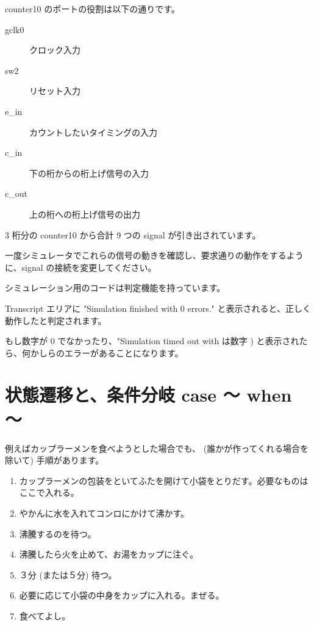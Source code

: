 \documentclass[letterpaper,10pt,dvipdfmx]{sphinxmanual}
\begin{document}
counter10 のポートの役割は以下の通りです。
\begin{description}
\item[{gclk0}] \leavevmode
クロック入力

\item[{sw2}] \leavevmode
リセット入力

\item[{e\_in}] \leavevmode
カウントしたいタイミングの入力

\item[{c\_in}] \leavevmode
下の桁からの桁上げ信号の入力

\item[{c\_out}] \leavevmode
上の桁への桁上げ信号の出力

\end{description}

3 桁分の counter10 から合計 9 つの signal が引き出されています。

一度シミュレータでこれらの信号の動きを確認し、要求通りの動作をするように、signal の接続を変更してください。

シミュレーション用のコードは判定機能を持っています。

Transcript エリアに "Simulation finished with 0 errors." と表示されると、正しく動作したと判定されます。

もし数字が 0 でなかったり、"Simulation timed out with  は数字 ) と表示されたら、何かしらのエラーがあることになります。


\section{状態遷移と、条件分岐 case ～ when ～}
\label{\detokenize{05_try:case-when}}
例えばカップラーメンを食べようとした場合でも、 (誰かが作ってくれる場合を除いて) 手順があります。
\begin{enumerate}
%
\item {} 
カップラーメンの包装をといてふたを開けて小袋をとりだす。必要なものはここで入れる。

\item {} 
やかんに水を入れてコンロにかけて沸かす。

\item {} 
沸騰するのを待つ。

\item {} 
沸騰したら火を止めて、お湯をカップに注ぐ。

\item {} 
３分 (または５分) 待つ。

\item {} 
必要に応じて小袋の中身をカップに入れる。まぜる。

\item {} 
食べてよし。

\end{enumerate}
\end{document}
